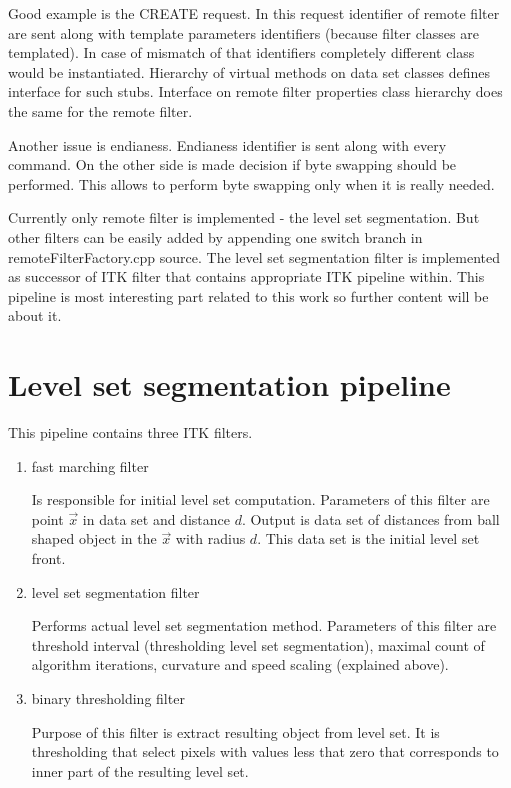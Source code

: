 \par
Good example is the CREATE request.
In this request identifier of remote filter are sent along with template parameters identifiers (because filter classes are templated).
In case of mismatch of that identifiers completely different class would be instantiated.
Hierarchy of virtual methods on data set classes defines interface for such stubs.
Interface on remote filter properties class hierarchy does the same for the remote filter.

\par
Another issue is endianess.
Endianess identifier is sent along with every command. On the other side is made decision if byte swapping should be performed.
This allows to perform byte swapping only when it is really needed.

\par
Currently only remote filter is implemented - the level set segmentation.
But other filters can be easily added by appending one switch branch in remoteFilterFactory.cpp source.
The level set segmentation filter is implemented as successor of ITK filter that contains appropriate ITK pipeline within.
This pipeline is most interesting part related to this work so further content will be about it.

\section{Level set segmentation pipeline}

This pipeline contains three ITK filters.
\begin{enumerate}
  \item{fast marching filter}
  \par
  Is responsible for initial level set computation.
Parameters of this filter are point $\vec{x}$ in data set and distance $d$.
Output is data set of distances from ball shaped object in the $\vec{x}$ with radius $d$.
This data set is the initial level set front.

  \item{level set segmentation filter}
  \par
  Performs actual level set segmentation method.
Parameters of this filter are threshold interval (thresholding level set segmentation), maximal count of algorithm iterations, curvature and speed scaling (explained above).

  \item{binary thresholding filter}
  \par
  Purpose of this filter is extract resulting object from level set.
It is thresholding that select pixels with values less that zero that corresponds to inner part of the resulting level set.
\end{enumerate}

